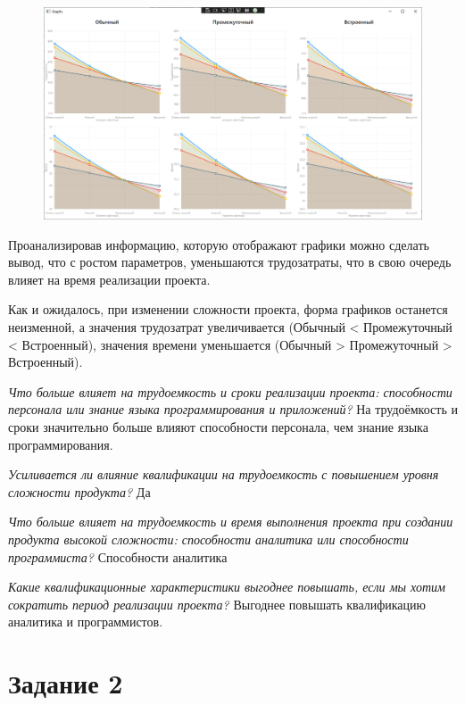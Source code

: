 \begin{figure}[H]
	\begin{center}
		\includegraphics[width=\textwidth]{imgs/task_1_1.png}
	\end{center}
\end{figure}

Проанализировав информацию, которую отображают графики можно сделать вывод, что с ростом параметров, уменьшаются трудозатраты, что в свою очередь влияет на время реализации проекта.

Как и ожидалось, при изменении сложности проекта, форма графиков останется неизменной, а значения трудозатрат увеличивается (Обычный < Промежуточный < Встроенный), значения времени уменьшается (Обычный > Промежуточный > Встроенный).

\textit{Что больше влияет на трудоемкость и сроки реализации проекта: способности персонала или знание языка программирования и приложений?} 
На трудоёмкость и сроки значительно больше влияют способности персонала, чем знание языка программирования.

\textit{Усиливается ли влияние квалификации на трудоемкость с повышением уровня сложности продукта?}
Да

\textit{Что больше влияет на трудоемкость и время выполнения проекта при создании продукта высокой сложности: способности аналитика или способности программиста?}
Способности аналитика

\textit{Какие квалификационные характеристики выгоднее повышать, если мы хотим сократить период реализации проекта?}
Выгоднее повышать квалификацию аналитика и программистов.

\section*{Задание 2}

